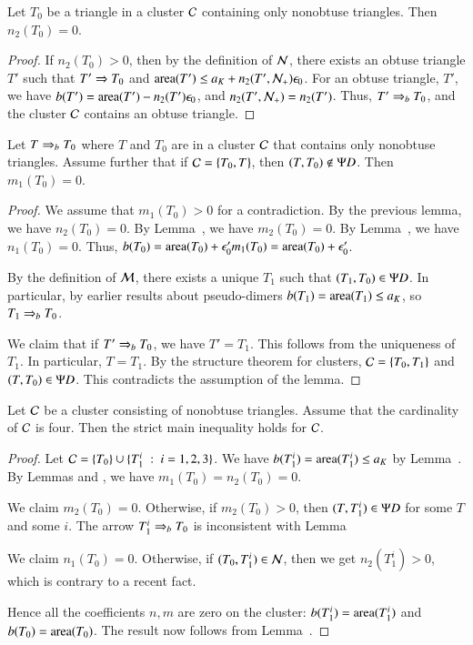 \begin{lemma} Let $T_0$ be a triangle 
 in a cluster $\mathcal C$ containing only nonobtuse triangles.  Then
$n_2(T_0)=0$.
\end{lemma}

\begin{proof}  If $n_2(T_0)>0$, then by the definition of $\mathcal N$,
there exists an obtuse triangle
$T'$ such that $T'\Rightarrow T_0$ and 
${\operatorname{area}}(T') \le a_K+  n_2(T',\mathcal N_+)\epsilon_0$.  For an obtuse triangle,
$T'$, we have $b(T') = {\operatorname{area}}(T') - n_2(T')\epsilon_0$, and $n_2(T',\mathcal N_+)=n_2(T')$.
Thus, $T'\Rightarrow_{b} T_0$, and the cluster $\mathcal C$ contains an obtuse triangle.
\end{proof}

\begin{lemma}  Let $T\Rightarrow_{b} T_0$ where $T$ and $T_0$ are in a cluster $\mathcal C$
that contains only nonobtuse triangles.  Assume further that if
$\mathcal C=\{T_0,T\}$, then $(T,T_0)\not\in\Psi D$.
Then $m_1(T_0)=0$.
\end{lemma}

\begin{proof}  We assume that $m_1(T_0)>0$ for a contradiction.
By the previous lemma, we have $n_2(T_0)=0$.  By Lemma~,
we have $m_2(T_0)=0$.  By Lemma~, we have $n_1(T_0)=0$.
Thus, $b(T_0) = {\operatorname{area}}(T_0) + \epsilon_0' m_1(T_0) = {\operatorname{area}}(T_0)+\epsilon_0'$.

By the definition of $\mathcal M$, there exists a unique $T_1$ such that $(T_1,T_0)\in \Psi D$.
In particular, by earlier results about pseudo-dimers $b(T_1)={\operatorname{area}}(T_1)\le a_K$, so $T_1\Rightarrow_{b} T_0$.

We claim that if $T'\Rightarrow_{b} T_0$, we have $T'=T_1$.  This follows from the uniqueness of $T_1$.
In particular, $T=T_1$.
By the structure theorem for clusters, $\mathcal C = \{T_0,T_1\}$ and $(T,T_0)\in\Psi D$.
This contradicts the assumption of the lemma.
\end{proof}

\begin{lemma}
Let $\mathcal C$ be a cluster consisting of nonobtuse triangles.  Assume
that the cardinality of $\mathcal C$ is four. 
Then the strict main inequality holds for $\mathcal C$.
\end{lemma}

\begin{proof}  Let $\mathcal C = \{T_0\}\cup \{T_1^i \ :\  i=1,2,3\}$.  
We have $b(T^i_1) = {\operatorname{area}}(T^i_1)\le a_K$ by Lemma~.
By Lemmas  and , we have $m_1(T_0)=n_2(T_0)=0$.

We claim $m_2(T_0)=0$.  Otherwise,
if $m_2(T_0) >0$, then  $(T,T^i_1)\in\Psi D$ for some $T$ and some $i$.
The arrow $T^i_1\Rightarrow_{b} T_0$ is inconsistent with Lemma~

We claim $n_1(T_0)=0$.  Otherwise, if $(T_0,T^i_1)\in\mathcal N$, then we get $n_2(T^i_1)>0$,
which is contrary to a recent fact.

Hence all the coefficients $n,m$ are zero on the cluster: $b(T^i_1)={\operatorname{area}}(T^i_1)$ and
$b(T_0) = {\operatorname{area}}(T_0)$.
The result now follows from Lemma~.
\end{proof}

